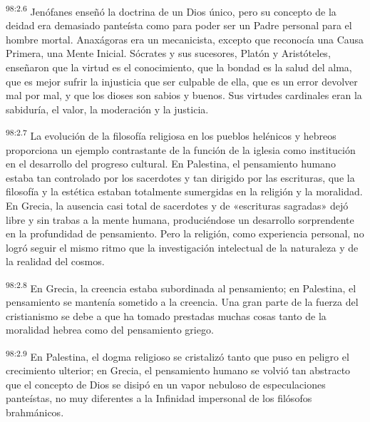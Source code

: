 \par
\textsuperscript{98:2.6} Jenófanes enseñó la doctrina de un Dios único, pero su concepto de la deidad era demasiado panteísta como para poder ser un Padre personal para el hombre mortal. Anaxágoras era un mecanicista, excepto que reconocía una Causa Primera, una Mente Inicial. Sócrates y sus sucesores, Platón y Aristóteles, enseñaron que la virtud es el conocimiento, que la bondad es la salud del alma, que es mejor sufrir la injusticia que ser culpable de ella, que es un error devolver mal por mal, y que los dioses son sabios y buenos. Sus virtudes cardinales eran la sabiduría, el valor, la moderación y la justicia.

\par
\textsuperscript{98:2.7} La evolución de la filosofía religiosa en los pueblos helénicos y hebreos proporciona un ejemplo contrastante de la función de la iglesia como institución en el desarrollo del progreso cultural. En Palestina, el pensamiento humano estaba tan controlado por los sacerdotes y tan dirigido por las escrituras, que la filosofía y la estética estaban totalmente sumergidas en la religión y la moralidad. En Grecia, la ausencia casi total de sacerdotes y de «escrituras sagradas» dejó libre y sin trabas a la mente humana, produciéndose un desarrollo sorprendente en la profundidad de pensamiento. Pero la religión, como experiencia personal, no logró seguir el mismo ritmo que la investigación intelectual de la naturaleza y de la realidad del cosmos.

\par
\textsuperscript{98:2.8} En Grecia, la creencia estaba subordinada al pensamiento; en Palestina, el pensamiento se mantenía sometido a la creencia. Una gran parte de la fuerza del cristianismo se debe a que ha tomado prestadas muchas cosas tanto de la moralidad hebrea como del pensamiento griego.

\par
\textsuperscript{98:2.9} En Palestina, el dogma religioso se cristalizó tanto que puso en peligro el crecimiento ulterior; en Grecia, el pensamiento humano se volvió tan abstracto que el concepto de Dios se disipó en un vapor nebuloso de especulaciones panteístas, no muy diferentes a la Infinidad impersonal de los filósofos brahmánicos.


